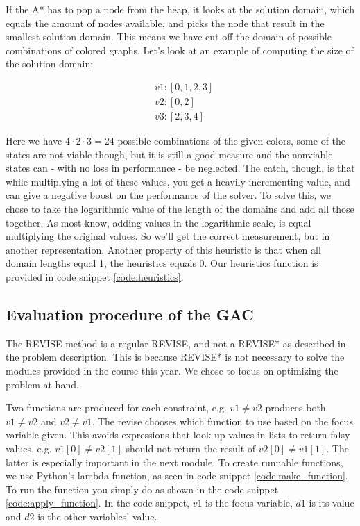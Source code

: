 If the A* has to pop a node from the heap, it looks at the solution domain, which equals the amount of nodes available, and picks the node that result in the smallest solution domain. This means we have cut off the domain of possible combinations of colored graphs. Let's look at an example of computing the size of the solution domain:

\begin{align*}
	&v1: [0,1,2,3]\\
	&v2: [0,2]\\
	&v3: [2,3,4]
\end{align*}

Here we have \(4 \cdot 2 \cdot 3 = 24\) possible combinations of the given colors, some of the states are not viable though, but it is still a good measure and the nonviable states can - with no loss in performance - be neglected. The catch, though, is that while multiplying a lot of these values, you get a heavily incrementing value, and can give a negative boost on the performance of the solver. To solve this, we chose to take the logarithmic value of the length of the domains and add all those together. As most know, adding values in the logarithmic scale, is equal multiplying the original values. So we'll get the correct measurement, but in another representation. Another property of this heuristic is that when all domain lengths equal 1, the heuristics equals 0. Our heuristics function is provided in code snippet \ref{code:heuristics}.



\subsection{Evaluation procedure of the GAC}
The REVISE method is a regular REVISE, and not a REVISE* as described in the problem description. This is because REVISE* is not necessary to solve the modules provided in the course this year. We chose to focus on optimizing the problem at hand.



Two functions are produced for each constraint, e.g. \( v1 \neq v2 \) produces both \(v1 \neq v2 \) and \(v2 \neq v1 \). The revise chooses which function to use based on the focus variable given. This avoids expressions that look up values in lists to return falsy values, e.g. \( v1[0] \neq v2[1] \) should not return the result of \( v2[0] \neq v1[1] \). The latter is especially important in the next module. To create runnable functions, we use Python's lambda function, as seen in code snippet \ref{code:make_function}. To run the function you simply do as shown in the code snippet \ref{code:apply_function}. In the code snippet, \(v1\) is the focus variable, \(d1\) is its value and \(d2\) is the other variables' value.

